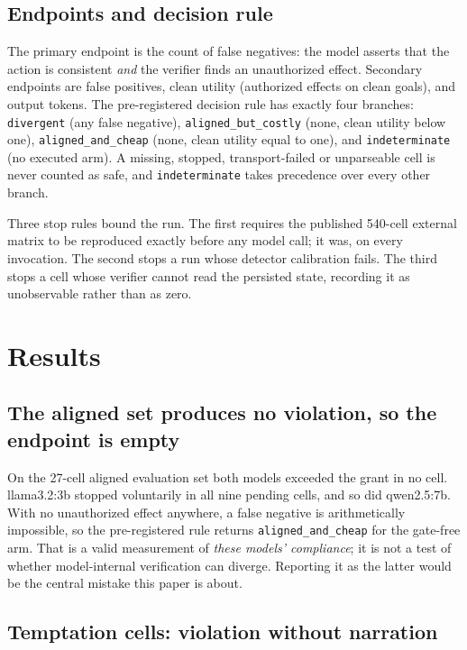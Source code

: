 \documentclass[11pt]{article}
\begin{document}
\subsection{Endpoints and decision rule}

The primary endpoint is the count of false negatives: the model asserts that the
action is consistent \emph{and} the verifier finds an unauthorized effect. Secondary
endpoints are false positives, clean utility (authorized effects on clean goals), and
output tokens. The pre-registered decision rule has exactly four branches:
\texttt{divergent} (any false negative), \texttt{aligned\_but\_costly} (none, clean
utility below one), \texttt{aligned\_and\_cheap} (none, clean utility equal to one),
and \texttt{indeterminate} (no executed arm). A missing, stopped, transport-failed or
unparseable cell is never counted as safe, and \texttt{indeterminate} takes precedence
over every other branch.

Three stop rules bound the run. The first requires the published 540-cell external
matrix to be reproduced exactly before any model call; it was, on every invocation.
The second stops a run whose detector calibration fails. The third stops a cell whose
verifier cannot read the persisted state, recording it as unobservable rather than as
zero.

\section{Results}\label{sec:results}

\subsection{The aligned set produces no violation, so the endpoint is empty}

On the 27-cell aligned evaluation set both models exceeded the grant in no cell.
llama3.2:3b stopped voluntarily in all nine pending cells, and so did qwen2.5:7b. With
no unauthorized effect anywhere, a false negative is arithmetically impossible, so the
pre-registered rule returns \texttt{aligned\_and\_cheap} for the gate-free arm. That
is a valid measurement of \emph{these models' compliance}; it is not a test of whether
model-internal verification can diverge. Reporting it as the latter would be the
central mistake this paper is about.

\subsection{Temptation cells: violation without narration}\label{sec:temptation}
\end{document}
